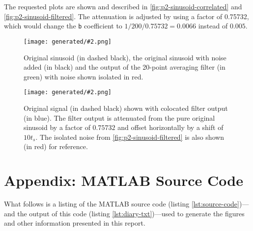 \documentclass{ajhlabreport}
\newcommand{\generatedfigw}[2]{
	\texttt{[image: generated/\#2.png]}
}
\begin{document}
The requested plots are shown and described in
\autoref{fig:p2-sinusoid-correlated} and \autoref{fig:p2-sinusoid-filtered}. The
attenuation is adjusted by using a factor of 0.75732, which would change the
\texttt{b} coefficient to $1/200/0.75732=0.0066$ instead of $0.005$.

\begin{figure}[H]
\centering
\generatedfigw{1}{p2_sinusoid_filtered}
\caption{Original sinusoid (in dashed black), the original sinusoid with noise
added (in black) and the output of the 20-point averaging filter (in
{\color{green}green}) with noise shown isolated in
{\color{red}red}.\label{fig:p2-sinusoid-filtered}}
\end{figure}

\begin{figure}[H]
\centering
\generatedfigw{1}{p2_sinusoid_correlated}
\caption{Original signal (in dashed black) shown with colocated filter output
(in {\color{blue}blue}). The filter output is attenuated from the pure original
sinusoid by a factor of $0.75732$ and offset horizontally by a shift of $10t_s$.
The isolated noise from \autoref{fig:p2-sinusoid-filtered} is also shown (in
{\color{red}red}) for reference.\label{fig:p2-sinusoid-correlated}}
\end{figure}


\newpage
\appendix
\chapter{Appendix: MATLAB Source Code}

What follows is a listing of the MATLAB source code (listing
\ref{lst:source-code})---and the output of this code (listing
\ref{lst:diary-txt})---used to generate the figures and other information
presented in this report.



\end{document}
